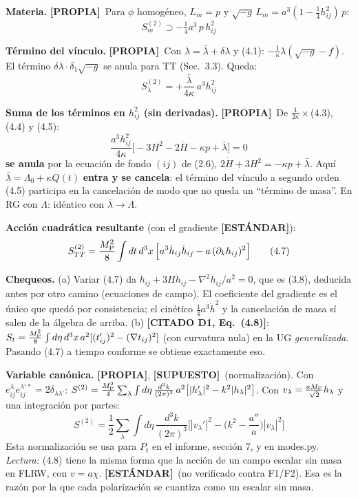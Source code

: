 \documentclass[11pt,a4paper]{article}
\newcommand{\MP}{M_{\rm P}}
\newcommand{\propia}{{\bfseries\color{TealBlue}[PROPIA]}}
\newcommand{\estandar}{{\bfseries\color{BurntOrange}[ESTÁNDAR]}}
\newcommand{\supuesto}{{\bfseries\color{Plum}[SUPUESTO]}}
\newcommand{\citado}[1]{{\bfseries\color{RoyalBlue}[CITADO #1]}}
\newcommand{\sub}[2]{\par\medskip\noindent{\bfseries\color{NavyBlue}#1}\quad\textbf{#2}}
\begin{document}
\sub{4.3}{Materia.} \propia\ Para $\phi$ homogéneo, $L_m=p$ y $\sqrt{-g}\,L_m=a^3(1-\tfrac14h_{ij}^2)\,p$:
\begin{equation}
S_m^{(2)}\supset-\tfrac14a^3\,p\,h_{ij}^2\tag{4.4}
\end{equation}

\sub{4.4}{Término del vínculo.} \propia\ Con $\lambda=\bar\lambda+\delta\lambda$ y (4.1): $-\frac1\kappa\lambda(\sqrt{-g}-f)$. El término $\delta\lambda\cdot\delta_1\sqrt{-g}$ se anula para TT (Sec.~3.3). Queda:
\begin{equation}
S_\lambda^{(2)}=+\frac{\bar\lambda}{4\kappa}\,a^3h_{ij}^2\tag{4.5}
\end{equation}

\sub{4.5}{Suma de los términos en $h_{ij}^2$ (sin derivadas).} \propia\ De $\frac1{2\kappa}\times$(4.3), (4.4) y (4.5):
\begin{equation}
\frac{a^3h_{ij}^2}{4\kappa}\Big[-3H^2-2\dot H-\kappa p+\bar\lambda\Big]=0\tag{4.6}
\end{equation}
\textbf{se anula} por la ecuación de fondo $(ij)$ de (2.6), $2\dot H+3H^2=-\kappa p+\bar\lambda$. Aquí $\bar\lambda=\Lambda_0+\kappa Q(t)$ \textbf{entra y se cancela}: el término del vínculo a segundo orden (4.5) participa en la cancelación de modo que no queda un ``término de masa''. En RG con $\Lambda$: idéntico con $\bar\lambda\to\Lambda$.

\smallskip\noindent\textbf{Acción cuadrática resultante} (con el gradiente \estandar):
\begin{equation}
S^{(2)}_{TT}=\frac{\MP^2}8\int dt\,d^3x\,\Big[a^3\dot h_{ij}\dot h_{ij}-a\,(\partial_kh_{ij})^2\Big]\tag{4.7}
\end{equation}

\noindent\textbf{Chequeos.} (a) Variar (4.7) da $\ddot h_{ij}+3H\dot h_{ij}-\nabla^2h_{ij}/a^2=0$, que es (3.8), deducida antes por otro camino (ecuaciones de campo). El coeficiente del gradiente es el único que quedó por consistencia; el cinético $\frac14a^3\dot h^2$ y la cancelación de masa sí salen de la álgebra de arriba. (b) \citado{D1, Eq.~(4.8)}: $S_t=\frac{\MP^2}8\int d\eta\,d^3x\,a^2[(t_{ij}')^2-(\nabla t_{ij})^2]$ (con curvatura nula) en la UG \emph{generalizada}. Pasando (4.7) a tiempo conforme se obtiene exactamente eso.

\sub{4.6}{Variable canónica.} \propia, \supuesto\ (normalización). Con $e^\lambda_{ij}e^{\lambda'*}_{ij}=2\delta_{\lambda\lambda'}$: $S^{(2)}=\frac{\MP^2}4\sum_\lambda\int d\eta\,\frac{d^3k}{(2\pi)^3}\,a^2\big[|h_\lambda'|^2-k^2|h_\lambda|^2\big]$. Con $v_\lambda=\frac{a\MP}{\sqrt2}h_\lambda$ y una integración por partes:
\begin{equation}
S^{(2)}=\frac12\sum_\lambda\int d\eta\,\frac{d^3k}{(2\pi)^3}\Big[|v_\lambda'|^2-\Big(k^2-\frac{a''}a\Big)|v_\lambda|^2\Big]\tag{4.8}
\end{equation}
Esta normalización se usa para $P_t$ en el informe, sección 7, y en modes.py. \emph{Lectura:} (4.8) tiene la misma forma que la acción de un campo escalar sin masa en FLRW, con $v=a\chi$. \estandar\ (no verificado contra F1/F2). Esa es la razón por la que cada polarización se cuantiza como un escalar sin masa.
\end{document}
